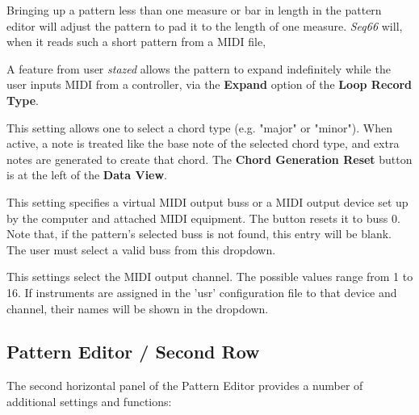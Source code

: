    Bringing up a pattern less than one measure or bar in
   length in the pattern editor will adjust the pattern to pad it to the
   length of one measure.
   \textsl{Seq66} will, when it reads such a short pattern
   from a MIDI file,

   A feature from user \textsl{stazed} allows the pattern to expand
   indefinitely while the user inputs MIDI from a controller, via the
   \textbf{Expand} option of the \textbf{Loop Record Type}.


%

   This setting allows one to select a chord type (e.g. "major" or "minor").
   When active, a note is treated like the base note of the selected chord
   type, and extra notes are generated to create that chord.
   The \textbf{Chord Generation Reset} button is at the left of the
   \textbf{Data View}.


   This setting specifies a virtual MIDI output buss or a
   MIDI output device set up by the computer and
   attached MIDI equipment.
   The button resets it to buss 0.
   Note that, if the pattern's selected buss is not found, this entry will be
   blank.  The user must select a valid buss from this dropdown.

   This settings select the MIDI output channel.
   The possible values range from 1 to 16.
   If instruments are assigned in the 'usr' configuration file
   to that device and channel, their names will be shown in the dropdown.

\subsection{Pattern Editor / Second Row}
\label{subsec:pattern_editor_second_row}

   The second horizontal panel of the Pattern Editor provides a number
   of additional settings and functions:

